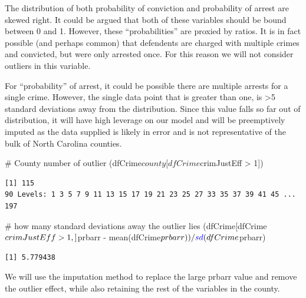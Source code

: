 \documentclass[]{article}
\newenvironment{Shaded}{}{}
\newcommand{\CommentTok}[1]{\textcolor[rgb]{0.00,0.50,0.00}{#1}}
\newcommand{\DecValTok}[1]{#1}
\newcommand{\KeywordTok}[1]{\textcolor[rgb]{0.00,0.00,1.00}{#1}}
\newcommand{\NormalTok}[1]{#1}
\newcommand{\OperatorTok}[1]{#1}
\newcommand{\StringTok}[1]{\textcolor[rgb]{0.00,0.50,0.50}{#1}}
\begin{document}
The distribution of both probability of conviction and probability of
arrest are skewed right. It could be argued that both of these variables
should be bound between 0 and 1. However, these ``probabilities'' are
proxied by ratios. It is in fact possible (and perhaps common) that
defendents are charged with multiple crimes and convicted, but were only
arrested once. For this reason we will not consider outliers in this
variable.

For ``probability'' of arrest, it could be possible there are multiple
arrests for a single crime. However, the single data point that is
greater than one, is \textgreater{}5 standard deviations away from the
distribution. Since this value falls so far out of distribution, it will
have high leverage on our model and will be preemptively imputed as the
data supplied is likely in error and is not representative of the bulk
of North Carolina counties.

\begin{Shaded}
\begin{Highlighting}[]
\CommentTok{# County number of outlier}
\NormalTok{(dfCrime}\OperatorTok{$}\NormalTok{county[dfCrime}\OperatorTok{$}\NormalTok{crimJustEff }\OperatorTok{>}\StringTok{ }\DecValTok{1}\NormalTok{]) }
\end{Highlighting}
\end{Shaded}

\begin{verbatim}
[1] 115
90 Levels: 1 3 5 7 9 11 13 15 17 19 21 23 25 27 33 35 37 39 41 45 ... 197
\end{verbatim}

\begin{Shaded}
\begin{Highlighting}[]
\CommentTok{# how many standard deviations away the outlier lies}
\NormalTok{(dfCrime[dfCrime}\OperatorTok{$}\NormalTok{crimJustEff }\OperatorTok{>}\StringTok{ }\DecValTok{1}\NormalTok{,]}\OperatorTok{$}\NormalTok{prbarr }\OperatorTok{-}\StringTok{ }\KeywordTok{mean}\NormalTok{(dfCrime}\OperatorTok{$}\NormalTok{prbarr))}\OperatorTok{/}\KeywordTok{sd}\NormalTok{(dfCrime}\OperatorTok{$}\NormalTok{prbarr)}
\end{Highlighting}
\end{Shaded}

\begin{verbatim}
[1] 5.779438
\end{verbatim}

We will use the imputation method to replace the large prbarr value and
remove the outlier effect, while also retaining the rest of the
variables in the county.
\end{document}
